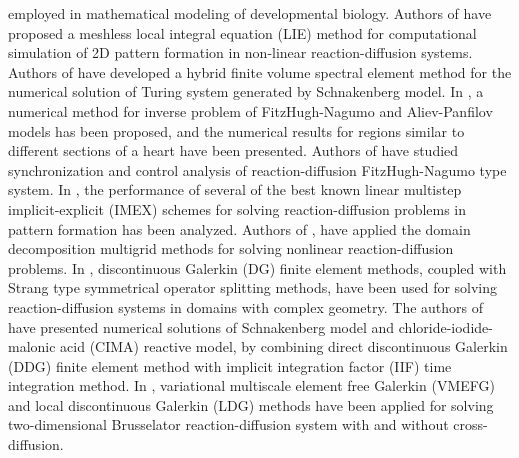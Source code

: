 \documentclass[12pt]{article}
\numberwithin{equation}{section}
\begin{document}
employed in mathematical modeling of developmental biology. Authors of \cite{Sladek} have proposed
a meshless local integral equation (LIE) method for computational simulation of 2D pattern
formation in non-linear reaction-diffusion systems. Authors of \cite{Shakeri} have developed a hybrid finite volume spectral element method for the numerical solution of Turing system generated by Schnakenberg model. In \cite{FitzNagu}, a numerical method for inverse problem of FitzHugh-Nagumo and Aliev-Panfilov models has been proposed, and the numerical results for regions similar to different sections of a heart have been presented. Authors of
\cite{Ambrosio} have studied synchronization and control analysis of reaction-diffusion FitzHugh-Nagumo type system. In \cite{Ruuth}, the performance of several of the best known linear multistep implicit-explicit (IMEX) schemes for solving reaction-diffusion problems in pattern formation has been analyzed. Authors of \cite{Arraras}, have applied the domain decomposition multigrid methods  for solving nonlinear reaction-diffusion problems.
In \cite{Zhu}, discontinuous Galerkin (DG) finite element methods, coupled with Strang type
symmetrical operator splitting methods, have been used for solving reaction-diffusion systems in
domains with complex geometry. The authors of \cite{Zhang} have presented numerical solutions of Schnakenberg model and chloride-iodide-malonic acid
(CIMA) reactive model, by combining direct discontinuous Galerkin (DDG) finite element method with implicit integration factor (IIF) time integration method. In \cite{Abbaszadeh2}, variational multiscale element free Galerkin (VMEFG) and local discontinuous Galerkin (LDG) methods have been applied for solving two-dimensional Brusselator reaction-diffusion system with and without cross-diffusion.
\end{document}
